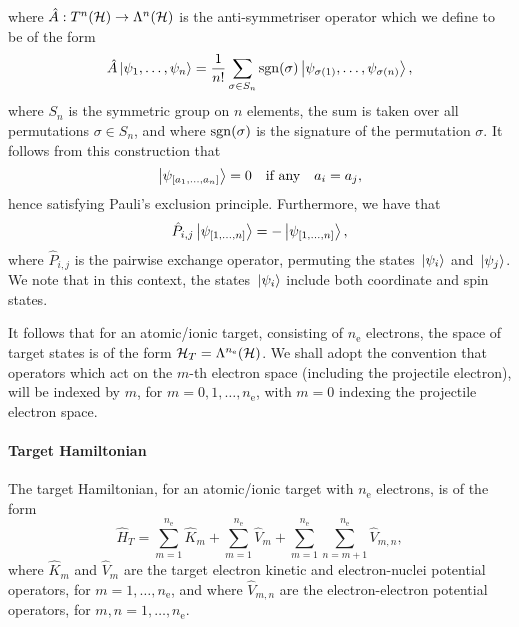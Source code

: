 \documentclass[]{article}
\begin{document}
where $\hat{A} : T^{n}(\mathcal{H}) \to \Lambda^{n}(\mathcal{H})$ is the
anti-symmetriser operator which we define to be of the form
\begin{equation}
  \label{eq:anti-symmetriser}
  \hat{A}
  \ket{\psi_{1}, \dotsc, \psi_{n}}
  =
  \dfrac{1}{n!}
  \sum_{\sigma \in S_{n}}
  \mathrm{sgn}(\sigma)
  \ket{\psi_{\sigma(1)}, \dotsc, \psi_{\sigma(n)}}
  ,
\end{equation}
where $S_{n}$ is the symmetric group on $n$ elements, the sum is taken over all
permutations $\sigma \in S_{n}$, and where $\mathrm{sgn}(\sigma)$ is the
signature of the permutation $\sigma$.
It follows from this construction that
\begin{equation}
  \label{eq:anti-symmetry}
  \ket{\psi_{\lrsq{a_{1}, \dotsc, a_{n}}}}
  =
  0
  \qq{if any}
  a_{i} = a_{j}
  ,
\end{equation}
hence satisfying Pauli's exclusion principle.
Furthermore, we have that
\begin{equation}
  \label{eq:pairwise-exchange}
  \hat{P}_{i, j}
  \ket{\psi_{[1, \dotsc, n]}}
  =
  -
  \ket{\psi_{[1, \dotsc, n]}}
  ,
\end{equation}
where $\hat{P}_{i, j}$ is the pairwise exchange operator, permuting the states
$\ket*{\psi_{i}}$ and $\ket*{\psi_{j}}$.
We note that in this context, the states $\ket*{\psi_{i}}$ include both coordinate
and spin states.

It follows that for an atomic/ionic target, consisting of $n_{\mathrm{e}}$
electrons, the space of target states is of the form
$\mathcal{H}_{T} = \Lambda^{n_{\mathrm{e}}}(\mathcal{H})$.
We shall adopt the convention that operators which act on the $m$-th electron
space (including the projectile electron), will be indexed by $m$, for
$m = 0, 1, \dotsc, n_{\mathrm{e}}$, with $m = 0$ indexing the projectile
electron space.

\paragraph{Target Hamiltonian}
\label{sec:th-ccc-target-hamil}

The target Hamiltonian, for an atomic/ionic target with $n_{\mathrm{e}}$
electrons, is of the form
\begin{equation}
  \label{eq:target-hamiltonian}
  \hat{H}_{T}
  =
  \sum_{m = 1}^{n_{\mathrm{e}}}
  \hat{K}_{m}
  +
  \sum_{m = 1}^{n_{\mathrm{e}}}
  \hat{V}_{m}
  +
  \sum_{m = 1}^{n_{\mathrm{e}}}
  \sum_{n = m + 1}^{n_{\mathrm{e}}}
  \hat{V}_{m, n}
  ,
\end{equation}
where $\hat{K}_{m}$ and $\hat{V}_{m}$ are the target electron kinetic and
electron-nuclei potential operators, for $m = 1, \dotsc, n_{\mathrm{e}}$, and
where $\hat{V}_{m, n}$ are the electron-electron potential operators, for
$m, n = 1, \dotsc, n_{\mathrm{e}}$.
\end{document}
